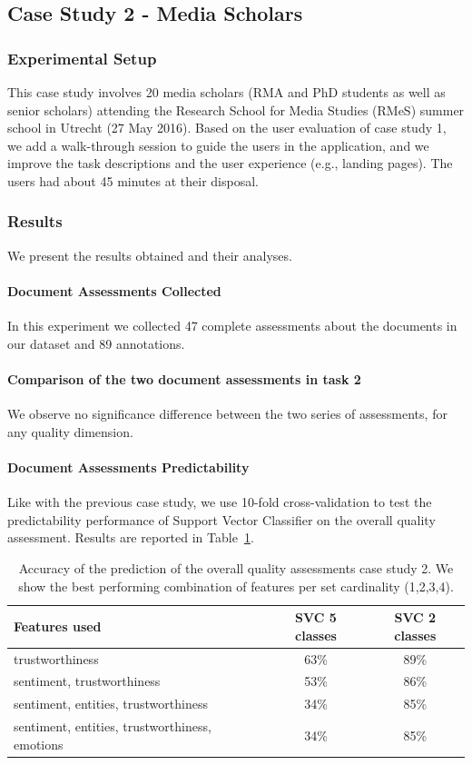 \documentclass{llncs}
\begin{document}
\subsection{Case Study 2 - Media Scholars}
\subsubsection{Experimental Setup}
This case study involves 20 media scholars (RMA and PhD students as well as senior scholars) attending the Research School for Media Studies (RMeS) summer school in Utrecht (27 May 2016).
Based on the user evaluation of case study 1, we add a walk-through session to guide the users in the application, and we improve the task descriptions and the user experience (e.g., landing pages).
The users had about 45 minutes at their disposal.%

\subsubsection{Results} We present the results obtained and their analyses. %
\paragraph{Document Assessments Collected} In this experiment we collected 47 complete assessments about the documents in our dataset and 89 annotations.
\paragraph{Comparison of the two document assessments in task 2} We observe no significance difference between the two series of assessments, for any quality dimension.
\paragraph{Document Assessments Predictability} Like with the previous case study, we use 10-fold cross-validation to test the predictability performance of Support Vector Classifier on the overall quality assessment. 
Results are reported in Table~\ref{tab:predm}.
\begin{table}
\centering
\caption{Accuracy of the prediction of the overall quality assessments case study 2. We show the best performing combination of features per set cardinality (1,2,3,4).\label{tab:predm}}
\begin{tabular}{|l|c|c|}
\hline
{\bf Features used} & {\bf SVC 5 classes} & {\bf SVC 2 classes} \\ \hline
trustworthiness & 63\% & 89\% \\ \hline
sentiment, trustworthiness & 53\% & 86\% \\ \hline
sentiment, entities, trustworthiness & 34\% & 85\% \\ \hline
sentiment, entities, trustworthiness, emotions & 34\% & 85\% \\ \hline
\end{tabular}
\end{table}
\end{document}
